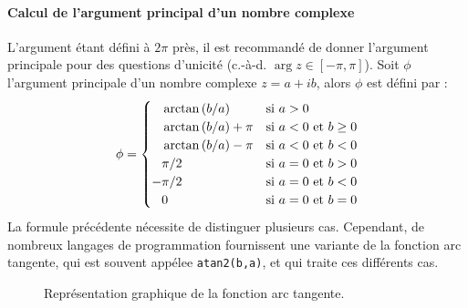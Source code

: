 \paragraph{Calcul de l'argument principal d'un nombre complexe}
L'argument étant défini à $2\pi$ près, il est recommandé de donner 
l'argument principale pour des questions d'unicité 
(c.-à-d. $\arg{z}\in[-\pi,\pi]$). 
Soit $\phi$ l'argument principale d'un nombre complexe $z=a+ib$, alors 
$\phi$ est défini par :
\[
\phi=
\begin{cases}
    \hphantom{-}\arctan{(b/a)}     & \text{si $a>0$} \\
    \hphantom{-}\arctan{(b/a)}+\pi & \text{si $a<0$ et $b\ge0$} \\
    \hphantom{-}\arctan{(b/a)}-\pi & \text{si $a<0$ et $b<0$} \\
    \hphantom{-} \pi/2             & \text{si $a=0$ et $b>0$} \\
                -\pi/2             & \text{si $a=0$ et $b<0$} \\
    \hphantom{-}0                  & \text{si $a=0$ et $b=0$} \\
\end{cases}
\]
La formule précédente nécessite de distinguer plusieurs cas.
Cependant, de nombreux langages de programmation fournissent
une variante de la fonction arc tangente, qui est souvent appélee
\verb?atan2(b,a)?, et qui traite ces différents cas. 
\begin{figure}[!ht]
    \centering
    
    \caption{Représentation graphique de la fonction arc tangente.
             \label{fig-arctangente}}
\end{figure}
